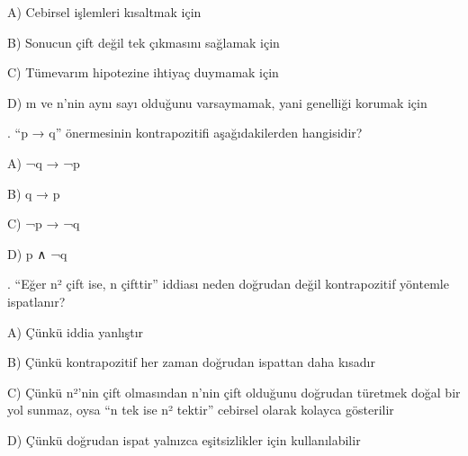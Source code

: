 \par\noindent\hspace*{1.6em}A) Cebirsel işlemleri kısaltmak için

\par\noindent\hspace*{1.6em}B) Sonucun çift değil tek çıkmasını sağlamak için

\par\noindent\hspace*{1.6em}C) Tümevarım hipotezine ihtiyaç duymamak için

\par\noindent\hspace*{1.6em}D) m ve n’nin aynı sayı olduğunu varsaymamak, yani genelliği korumak için

\par\smallskip{}. “p → q” önermesinin kontrapozitifi aşağıdakilerden hangisidir?

\par\noindent\hspace*{1.6em}A) ¬q → ¬p

\par\noindent\hspace*{1.6em}B) q → p

\par\noindent\hspace*{1.6em}C) ¬p → ¬q

\par\noindent\hspace*{1.6em}D) p ∧ ¬q

\par\smallskip{}. “Eğer n² çift ise, n çifttir” iddiası neden doğrudan değil kontrapozitif yöntemle ispatlanır?

\par\noindent\hspace*{1.6em}A) Çünkü iddia yanlıştır

\par\noindent\hspace*{1.6em}B) Çünkü kontrapozitif her zaman doğrudan ispattan daha kısadır

\par\noindent\hspace*{1.6em}C) Çünkü n²’nin çift olmasından n’nin çift olduğunu doğrudan türetmek doğal bir yol sunmaz, oysa “n tek ise n² tektir” cebirsel olarak kolayca gösterilir

\par\noindent\hspace*{1.6em}D) Çünkü doğrudan ispat yalnızca eşitsizlikler için kullanılabilir

